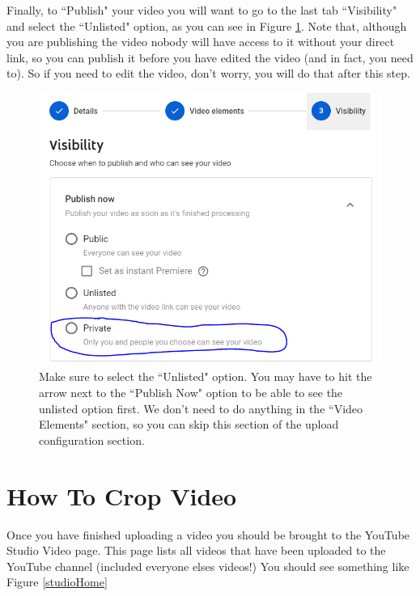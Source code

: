 \documentclass{article}
\begin{document}
        
        \newpage
        Finally, to ``Publish" your video you will want to go to the last tab ``Visibility" and select the ``Unlisted" option, as you can see in Figure \ref{publishVisibility}. Note that, although you are publishing the video nobody will have access to it without your direct link, so you can publish it before you have edited the video (and in fact, you need to). So if you need to edit the video, don't worry, you will do that after this step. 
    
        \begin{figure}[h]
            \includegraphics[width=\textwidth]{publishVisibility.png}
            \caption{Make sure to select the ``Unlisted" option. You may have to hit the arrow next to the ``Publish Now" option to be able to see the unlisted option first. We don't need to do anything in the ``Video Elements" section, so you can skip this section of the upload configuration section.}
            \label{publishVisibility}
        \end{figure}
    
    \newpage
    
    \section{How To Crop Video}
        
        Once you have finished uploading a video you should be brought to the YouTube Studio Video page. This page lists all videos that have been uploaded to the YouTube channel (included everyone elses videos!) You should see something like Figure \ref{studioHome}
        
\end{document}
